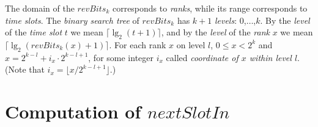 \documentclass{llncs}
\begin{document}
The domain of the $revBits_k$ corresponds to {\em ranks}, while its range corresponds to {\em time slots}.
The {\em binary search tree} of $revBits_k$ has $k+1$ {\em levels}: $0$,$\ldots$,$k$.
By the {\em level} of the {\em time slot} $t$ we mean $\lceil \lg_2 (t+1)\rceil$,
and by the {\em level} of the {\em rank} $x$ we mean $\lceil \lg_2 (revBits_k(x)+1)\rceil$.
For each rank $x$ on level $l$, $0\le x<2^k$ and $x=2^{k-l}+i_x\cdot 2^{k-l+1}$, for some integer $i_x$
called {\em coordinate of $x$ within level $l$}.
(Note that $i_x=\lfloor x/2^{k-l+1}\rfloor$.)

 




\section{Computation of $nextSlotIn$}\label{nextSlotIn-section}
\end{document}
